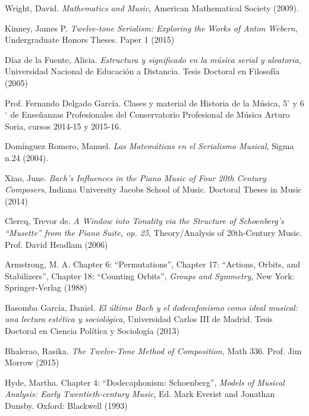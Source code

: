 	\begin{thebibliography}{00}

			{\sc Wright, David.} 
			\textit{Mathematics and Music},
			American Mathematical Society 
			(2009).
			
			{\sc Kinney, James P.} 
			\textit{Twelve-tone Serialism: Exploring the Works of Anton Webern},
			Undergraduate Honors Theses.
			Paper 1
			(2015)
			
			{\sc Díaz de la Fuente, Alicia.} 
			\textit{Estructura y significado en la música serial y aleatoria},
			Universidad Nacional de Educación a Distancia.
			Tesis Doctoral en Filosofía
			(2005)
			
			{\sc Prof. Fernando Delgado García.} 
			Clases y material de Historia de la Música, 5$^{\circ}$ y 6$^{\circ}$ de Enseñanzas Profesionales del Conservatorio Profesional de Música Arturo Soria, cursos 2014-15 y 2015-16.
			
			{\sc Domínguez Romero, Manuel.} 
			\textit{Las Matemáticas en el Serialismo Musical},
			Sigma n.24 
			(2004).
					
			{\sc Xiao, June.} 
			\textit{Bach’s Influences in the Piano Music of Four 20th Century Composers},
			Indiana University Jacobs School of Music.
			Doctoral Theses in Music
			(2014)
			
			{\sc Clercq, Trevor de.} 
			\textit{A Window into Tonality via the Structure of Schoenberg's ``Musette'' from the Piano Suite, op. 25},
			Theory/Analysis of 20th-Century Music.
			Prof. David Headlam
			(2006)
			
			{\sc Armstrong, M. A.} Chapter 6: “Permutations”, Chapter 17: “Actions, Orbits, and Stabilizers”, Chapter 18: “Counting Orbits”,
			\textit{Groups and Symmetry},
			New York: Springer-Verlag
			(1988)
			
			{\sc Basomba García, Daniel.} 
			\textit{El último Bach y el dodecafonismo como ideal musical: una lectura estética y sociológica},
			Universidad Carlos III de Madrid.
			Tesis Doctoral en Ciencia Política y Sociología
			(2013)
			
			{\sc Bhalerao, Rasika.} 
			\textit{The Twelve-Tone Method of Composition},
			Math 336.
			Prof. Jim Morrow
			(2015)
			
			{\sc Hyde, Martha.} Chapter 4: “Dodecaphonism: Schoenberg”,
			\textit{Models of Musical Analysis: Early Twentieth-century Music},
			Ed. Mark Everist and Jonathan Dunsby.
			Oxford: Blackwell
			(1993)
			

\end{thebibliography}
